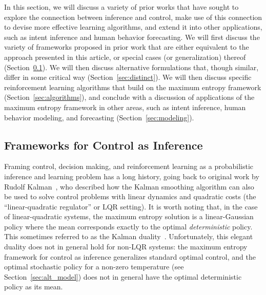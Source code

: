 In this section, we will discuss a variety of prior works that have sought to explore the connection between inference and control, make use of this connection to devise more effective learning algorithms, and extend it into other applications, such as intent inference and human behavior forecasting. We will first discuss the variety of frameworks proposed in prior work that are either equivalent to the approach presented in this article, or special cases (or generalization) thereof (Section~\ref{sec:prior_frameworks}). We will then discuss alternative formulations that, though similar, differ in some critical way (Section~\ref{sec:distinct}). We will then discuss specific reinforcement learning algorithms that build on the maximum entropy framework (Section~\ref{sec:algorithms}), and conclude with a discussion of applications of the maximum entropy framework in other areas, such as intent inference, human behavior modeling, and forecasting (Section~\ref{sec:modeling}).

\subsection{Frameworks for Control as Inference}
\label{sec:prior_frameworks}

Framing control, decision making, and reinforcement learning as a probabilistic inference and learning problem has a long history, going back to original work by Rudolf Kalman~\citep{kalman_filter}, who described how the Kalman smoothing algorithm can also be used to solve control problems with linear dynamics and quadratic costs (the ``linear-quadratic regulator'' or LQR setting). It is worth noting that, in the case of linear-quadratic systems, the maximum entropy solution is a linear-Gaussian policy where the mean corresponds exactly to the optimal \emph{deterministic} policy. This sometimes referred to as the Kalman duality~\citep{todorov_kalman_duality}. Unfortunately, this elegant duality does not in general hold for non-LQR systems: the maximum entropy framework for control as inference generalizes standard optimal control, and the optimal stochastic policy for a non-zero temperature (see Section~\ref{sec:alt_model}) does not in general have the optimal deterministic policy as its mean.

